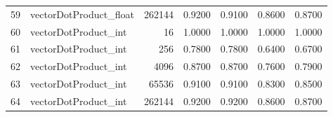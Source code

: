 \begin{tabular}{rlrrrrr}
 59 & vectorDotProduct\_float & 262144 &   0.9200 &     0.9100 &   0.8600 &     0.8700 \\
 60 & vectorDotProduct\_int   &     16 &   1.0000 &     1.0000 &   1.0000 &     1.0000 \\
 61 & vectorDotProduct\_int   &    256 &   0.7800 &     0.7800 &   0.6400 &     0.6700 \\
 62 & vectorDotProduct\_int   &   4096 &   0.8700 &     0.8700 &   0.7600 &     0.7900 \\
 63 & vectorDotProduct\_int   &  65536 &   0.9100 &     0.9100 &   0.8300 &     0.8500 \\
 64 & vectorDotProduct\_int   & 262144 &   0.9200 &     0.9200 &   0.8600 &     0.8700 \\
\bottomrule
\end{tabular}